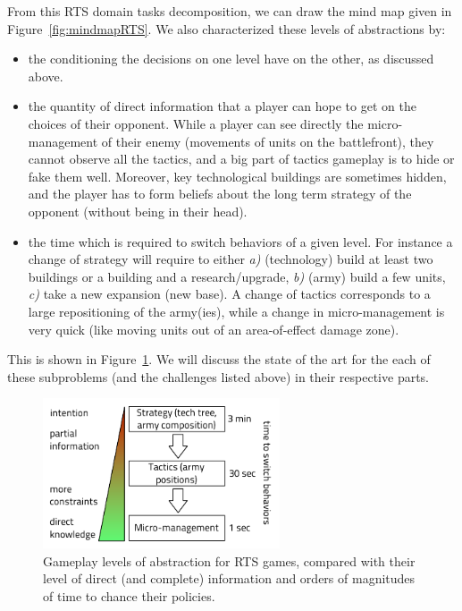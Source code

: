 From this RTS domain tasks decomposition, we can draw the mind map given in Figure~\ref{fig:mindmapRTS}. We also characterized these levels of abstractions by:
\begin{itemize}
    \item the conditioning the decisions on one level have on the other, as discussed above.
    \item the quantity of direct information that a player can hope to get on the choices of their opponent. While a player can see directly the micro-management of their enemy (movements of units on the battlefront), they cannot observe all the tactics, and a big part of tactics gameplay is to hide or fake them well. Moreover, key technological buildings are sometimes hidden, and the player has to form beliefs about the long term strategy of the opponent (without being in their head).
    \item the time which is required to switch behaviors of a given level. For instance a change of strategy will require to either \textit{a)} (technology) build at least two buildings or a building and a research/upgrade, \textit{b)} (army) build a few units, \textit{c)} take a new expansion (new base). A change of tactics corresponds to a large repositioning of the army(ies), while a change in micro-management is very quick (like moving units out of an area-of-effect damage zone).
\end{itemize}
This is shown in Figure~\ref{fig:sc_abstraction_tactics}. We will discuss the state of the art for the each of these subproblems (and the challenges listed above) in their respective parts.

\begin{figure}[htp]
\centerline{\includegraphics[width=7cm]{images/starcraft_levels_abstraction_light.pdf}}
\caption{Gameplay levels of abstraction for RTS games, compared with their level of direct (and complete) information and orders of magnitudes of time to chance their policies.}
\label{fig:sc_abstraction_tactics}
\end{figure}


